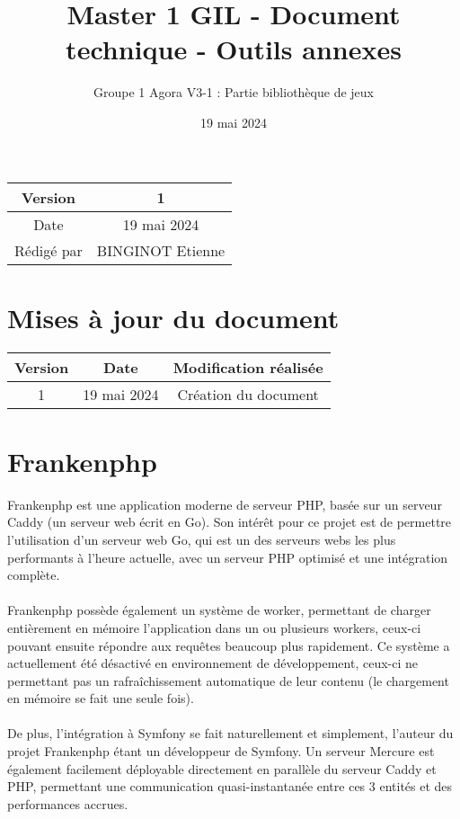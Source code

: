 \documentclass{article}
\title{Master 1 GIL - Document technique - Outils annexes}
\author{Groupe 1 Agora V3-1 : Partie bibliothèque de jeux}
\date{19 mai 2024}
\begin{document}
\maketitle
    \begin{center}
        \begin{tabular}{|| c | c ||}
                \hline 
                Version & 1 \\
                \hline 
                Date & 19 mai 2024 \\
                \hline
                Rédigé par & BINGINOT Etienne\\
                \hline
        \end{tabular}
    \end{center}

    \newpage
    \section*{Mises à jour du document}

    \begin{center}
        \begin{tabular}{|| c | c | c ||}
                \hline 
                Version & Date & Modification réalisée \\
                \hline
                \hline 
                1 & 19 mai 2024 & Création du document \\
                \hline
        \end{tabular}
    \end{center}

    \newpage
    \tableofcontents
    \newpage

    \section{Frankenphp}

        Frankenphp est une application moderne de serveur PHP, basée sur un serveur Caddy (un serveur web écrit en Go). Son intérêt pour ce projet est de permettre l'utilisation d'un serveur web Go, qui est un des serveurs webs les plus performants à l'heure actuelle, avec un serveur PHP optimisé et une intégration complète.\\
        \\
        \indent Frankenphp possède également un système de worker, permettant de charger entièrement en mémoire l'application dans un ou plusieurs workers, ceux-ci pouvant ensuite répondre aux requêtes beaucoup plus rapidement. Ce système a actuellement été désactivé en environnement de développement, ceux-ci ne permettant pas un rafraîchissement automatique de leur contenu (le chargement en mémoire se fait une seule fois).\\
        \\
        \indent De plus, l'intégration à Symfony se fait naturellement et simplement, l'auteur du projet Frankenphp étant un développeur de Symfony. Un serveur Mercure est également facilement déployable directement en parallèle du serveur Caddy et PHP, permettant une communication quasi-instantanée entre ces 3 entités et des performances accrues.
\end{document}
